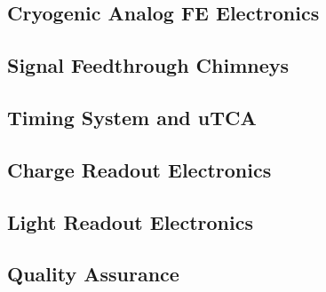 \subsection{Cryogenic Analog FE Electronics}
\label{sec:fddp-tpc-elec-prod-fe}

\subsection{Signal Feedthrough Chimneys}
\label{sec:fddp-tpc-elec-prod-sft}

\subsection{Timing System and uTCA}
\label{sec:fddp-tpc-elec-prod-utca}



\subsection{Charge Readout Electronics}
\label{sec:fddp-tpc-elec-prod-cro}

\subsection{Light Readout Electronics}
\label{sec:fddp-tpc-elec-prod-lro}


\subsection{Quality Assurance}
\label{sec:fddp-tpc-elec-qa}


